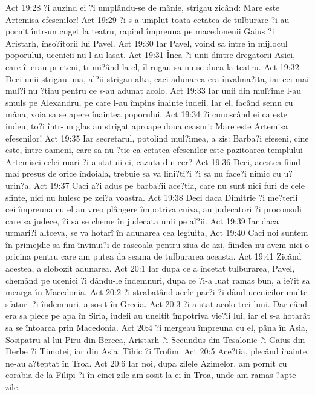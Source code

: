 Act 19:28  ?i auzind ei ?i umplându-se de mânie, strigau zicând: Mare este Artemisa efesenilor!
Act 19:29  ?i s-a umplut toata cetatea de tulburare ?i au pornit într-un cuget la teatru, rapind împreuna pe macedonenii Gaius ?i Aristarh, înso?itorii lui Pavel.
Act 19:30  Iar Pavel, voind sa intre în mijlocul poporului, ucenicii nu l-au lasat.
Act 19:31  Înca ?i unii dintre dregatorii Asiei, care îi erau prieteni, trimi?ând la el, îl rugau sa nu se duca la teatru.
Act 19:32  Deci unii strigau una, al?ii strigau alta, caci adunarea era învalma?ita, iar cei mai mul?i nu ?tiau pentru ce s-au adunat acolo.
Act 19:33  Iar unii din mul?ime l-au smuls pe Alexandru, pe care l-au împins înainte iudeii. Iar el, facând semn cu mâna, voia sa se apere înaintea poporului.
Act 19:34  ?i cunoscând ei ca este iudeu, to?i într-un glas au strigat aproape doua ceasuri: Mare este Artemisa efesenilor!
Act 19:35  Iar secretarul, potolind mul?imea, a zis: Barba?i efeseni, cine este, între oameni, care sa nu ?tie ca cetatea efesenilor este pazitoarea templului Artemisei celei mari ?i a statuii ei, cazuta din cer?
Act 19:36  Deci, acestea fiind mai presus de orice îndoiala, trebuie sa va lini?ti?i ?i sa nu face?i nimic cu u?urin?a.
Act 19:37  Caci a?i adus pe barba?ii ace?tia, care nu sunt nici furi de cele sfinte, nici nu hulesc pe zei?a voastra.
Act 19:38  Deci daca Dimitrie ?i me?terii cei împreuna cu el au vreo plângere împotriva cuiva, au judecatori ?i proconsuli care sa judece, ?i sa se cheme în judecata unii pe al?ii.
Act 19:39  Iar daca urmari?i altceva, se va hotarî în adunarea cea legiuita,
Act 19:40  Caci noi suntem în primejdie sa fim învinui?i de rascoala pentru ziua de azi, fiindca nu avem nici o pricina pentru care am putea da seama de tulburarea aceasta.
Act 19:41  Zicând acestea, a slobozit adunarea.
Act 20:1  Iar dupa ce a încetat tulburarea, Pavel, chemând pe ucenici ?i dându-le îndemnuri, dupa ce ?i-a luat ramas bun, a ie?it sa mearga în Macedonia.
Act 20:2  ?i strabatând acele par?i ?i dând ucenicilor multe sfaturi ?i îndemnuri, a sosit în Grecia.
Act 20:3  ?i a stat acolo trei luni. Dar când era sa plece pe apa în Siria, iudeii au uneltit împotriva vie?ii lui, iar el s-a hotarât sa se întoarca prin Macedonia.
Act 20:4  ?i mergeau împreuna cu el, pâna în Asia, Sosipatru al lui Piru din Bereea, Aristarh ?i Secundus din Tesalonic ?i Gaius din Derbe ?i Timotei, iar din Asia: Tihic ?i Trofim.
Act 20:5  Ace?tia, plecând înainte, ne-au a?teptat în Troa.
Act 20:6  Iar noi, dupa zilele Azimelor, am pornit cu corabia de la Filipi ?i în cinci zile am sosit la ei în Troa, unde am ramas ?apte zile.
